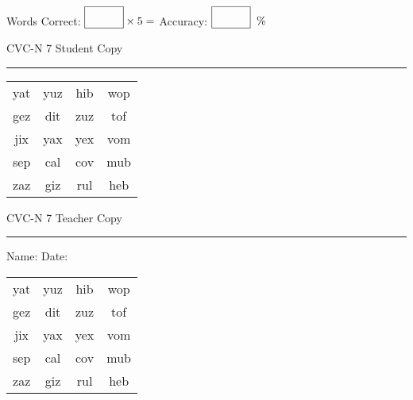 \documentclass{memoir}
\begin{document}
\small

Words Correct: $\fbox{\phantom{\huge 100}} \times 5 = $ Accuracy: $\fbox{\phantom{\huge 100}}\;\; \%$ 

\vfill

\newpage


\footnotesize \noindent
CVC-N 7 \hfill Student Copy
\smallskip
\hrule

\Large

\setlength{\tabcolsep}{14pt}
\def\arraystretch{2}

{\selectfont


\begin{vplace}[0.5]
\begin{center}
\begin{tabular}{cccc}
yat & yuz & hib & wop \\
gez & dit & zuz & tof \\
jix & yax & yex & vom \\
sep & cal & cov & mub \\
zaz & giz & rul & heb \\
\end{tabular}
\end{center}
\end{vplace}

}

\newpage

\footnotesize \noindent
CVC-N 7 \hfill Teacher Copy
\smallskip
\hrule

\small

\vfill

\noindent
Name: \underline{\hspace{1.75in}} \hfill Date: \underline{\hspace{1in}}

\Large

{\selectfont


\begin{vplace}[0.5]
\begin{center}
\begin{tabular}{cccc}
yat & yuz & hib & wop \\
gez & dit & zuz & tof \\
jix & yax & yex & vom \\
sep & cal & cov & mub \\
zaz & giz & rul & heb \\
\end{tabular}
\end{center}
\end{vplace}



}
\end{document}

